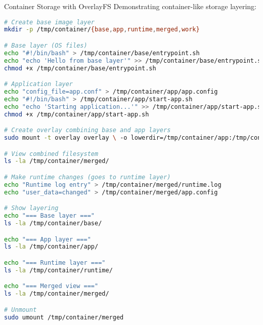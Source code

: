 \begin{example2}{Container Storage with OverlayFS}
    Demonstrating container-like storage layering:
    
\begin{lstlisting}[language=bash, style=basesmol]
# Create base image layer
mkdir -p /tmp/container/{base,app,runtime,merged,work}

# Base layer (OS files)
echo "#!/bin/bash" > /tmp/container/base/entrypoint.sh
echo "echo 'Hello from base layer'" >> /tmp/container/base/entrypoint.sh
chmod +x /tmp/container/base/entrypoint.sh

# Application layer
echo "config_file=app.conf" > /tmp/container/app/app.config
echo "#!/bin/bash" > /tmp/container/app/start-app.sh
echo "echo 'Starting application...'" >> /tmp/container/app/start-app.sh
chmod +x /tmp/container/app/start-app.sh

# Create overlay combining base and app layers
sudo mount -t overlay overlay \ -o lowerdir=/tmp/container/app:/tmp/container/base,upperdir=/tmp/container/runtime,workdir=/tmp/container/work \/tmp/container/merged

# View combined filesystem
ls -la /tmp/container/merged/

# Make runtime changes (goes to runtime layer)
echo "Runtime log entry" > /tmp/container/merged/runtime.log
echo "user_data=changed" > /tmp/container/merged/app.config

# Show layering
echo "=== Base layer ==="
ls -la /tmp/container/base/

echo "=== App layer ==="
ls -la /tmp/container/app/

echo "=== Runtime layer ==="
ls -la /tmp/container/runtime/

echo "=== Merged view ==="
ls -la /tmp/container/merged/

# Unmount
sudo umount /tmp/container/merged
\end{lstlisting}
\end{example2}